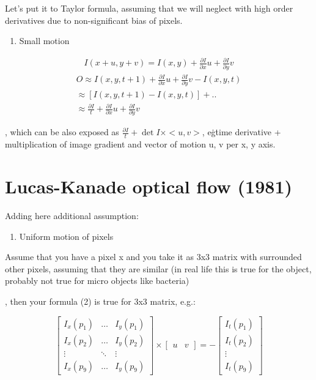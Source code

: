\documentclass[11pt]{article}
\begin{document}
    Let's put it to Taylor formula, assuming that we will neglect with high order derivatives due to non-significant bias of pixels.

    \begin{enumerate}[resume]
        \item Small motion
    \end{enumerate}

    \begin{gather*}
        I(x + u, y + v) = I(x, y) + \frac{\partial{I}}{\partial{x}}u + \frac{\partial{I}}{\partial{y}}v
    \end{gather*}
    \begin{multline}
        O \approx I(x, y, t + 1) + \frac{\partial{I}}{\partial{x}}u + \frac{\partial{I}}{\partial{y}}v - I(x, y, t) \\
            \approx [I(x, y, t + 1) - I(x, y, t)] + .. \\
            \approx \frac{\partial{I}}{t} + \frac{\partial{I}}{\partial{x}}u + \frac{\partial{I}}{\partial{y}}v
    \end{multline}

    , which can be also exposed as $\frac{\partial{I}}{t} + \det{I} \times <u, v>$,
    e\.g\. time derivative + multiplication of image gradient and vector of motion u, v per x, y axis.

    \section{Lucas-Kanade optical flow (1981)} \label{sec:lucaskanade}

    Adding here additional assumption:

    \begin{enumerate}[resume]
        \item Uniform motion of pixels
    \end{enumerate}

    Assume that you have a pixel x and you take it as 3x3 matrix with surrounded other pixels,
    assuming that they are similar (in real life this is true for the object, probably not true for micro objects like
    bacteria)

    , then your formula (2) is true for 3x3 matrix, e.g.:

    \[
        \begin{bmatrix}
            I_x(p_1) & \dots & I_y(p_1) \\
            I_x(p_2) & \dots & I_y(p_2) \\
            \vdots & \ddots & \vdots \\
            I_x(p_9) & \dots & I_y(p_9)
        \end{bmatrix}
        \times
        \begin{bmatrix}
            u & v
        \end{bmatrix}
        = -
        \begin{bmatrix}
            I_t(p_1) \\
            I_t(p_2) \\
            \vdots   \\
            I_t(p_9)
        \end{bmatrix}
    \]
\end{document}
